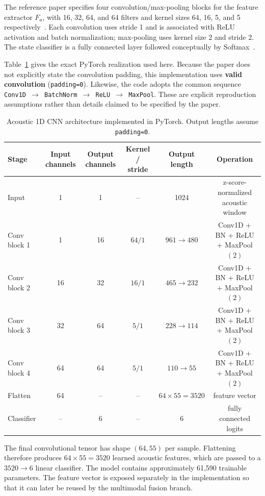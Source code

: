 \documentclass[10pt,a4paper,twocolumn]{article}
\begin{document}
The reference paper specifies four convolution/max-pooling blocks for the feature extractor $F_a$, with 16, 32, 64, and 64 filters and kernel sizes 64, 16, 5, and 5 respectively~\cite{zhao2025}. Each convolution uses stride 1 and is associated with ReLU activation and batch normalization; max-pooling uses kernel size 2 and stride 2. The state classifier is a fully connected layer followed conceptually by Softmax~\cite{zhao2025}.

Table~\ref{tab:architecture} gives the exact PyTorch realization used here. Because the paper does not explicitly state the convolution padding, this implementation uses \textbf{valid convolution} (\texttt{padding=0}). Likewise, the code adopts the common sequence \texttt{Conv1D $\rightarrow$ BatchNorm $\rightarrow$ ReLU $\rightarrow$ MaxPool}. These are explicit reproduction assumptions rather than details claimed to be specified by the paper.

\begin{table}[!t]
\centering
\caption{Acoustic 1D CNN architecture implemented in PyTorch. Output lengths assume \texttt{padding=0}.}
\label{tab:architecture}
\small
\begin{tabular}{l c c c c c}
\toprule
\textbf{Stage} & \textbf{Input channels} & \textbf{Output channels} & \textbf{Kernel / stride} & \textbf{Output length} & \textbf{Operation}\\
\midrule
Input & 1 & 1 & -- & 1024 & z-score-normalized acoustic window\\
Conv block 1 & 1 & 16 & $64/1$ & $961\rightarrow480$ & Conv1D + BN + ReLU + MaxPool$(2)$\\
Conv block 2 & 16 & 32 & $16/1$ & $465\rightarrow232$ & Conv1D + BN + ReLU + MaxPool$(2)$\\
Conv block 3 & 32 & 64 & $5/1$ & $228\rightarrow114$ & Conv1D + BN + ReLU + MaxPool$(2)$\\
Conv block 4 & 64 & 64 & $5/1$ & $110\rightarrow55$ & Conv1D + BN + ReLU + MaxPool$(2)$\\
Flatten & 64 & -- & -- & $64\times55=3520$ & feature vector\\
Classifier & -- & 6 & -- & 6 & fully connected logits\\
\bottomrule
\end{tabular}
\end{table}

The final convolutional tensor has shape $(64,55)$ per sample. Flattening therefore produces $64\times55=3520$ learned acoustic features, which are passed to a $3520\rightarrow6$ linear classifier. The model contains approximately 61,590 trainable parameters. The feature vector is exposed separately in the implementation so that it can later be reused by the multimodal fusion branch.
\end{document}
